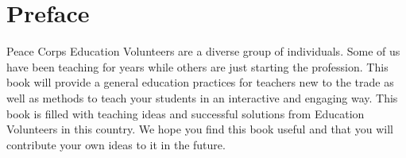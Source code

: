 \chapter*{Preface}
Peace Corps Education Volunteers are a diverse group of individuals. Some of us have been teaching for years while others are just starting the profession. This book will provide a general education practices for teachers new to the trade as well as methods to teach your students in an interactive and engaging way. This book is filled with teaching ideas and successful solutions from Education Volunteers in this country. We hope you find this book useful and that you will contribute your own ideas to it in the future.